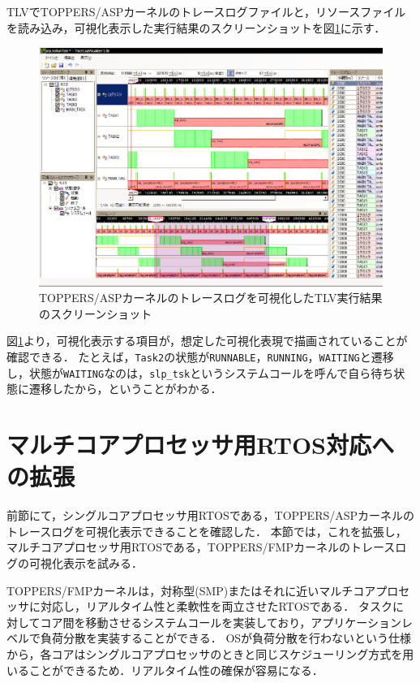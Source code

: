TLVでTOPPERS/ASPカーネルのトレースログファイルと，リソースファイルを読み込み，可視化表示した実行結果のスクリーンショットを図\ref{fig:aspTLVscreenShot}に示す．

\begin{figure}[tb]
\begin{center}
\includegraphics[width=15cm]{img/aspTLVscreenShot.eps}
\caption{TOPPERS/ASPカーネルのトレースログを可視化したTLV実行結果のスクリーンショット}
\label{fig:aspTLVscreenShot}
\end{center}
\end{figure}

図\ref{fig:aspTLVscreenShot}より，可視化表示する項目が，想定した可視化表現で描画されていることが確認できる．
たとえば，{\tt Task2}の状態が{\tt RUNNABLE}，{\tt RUNNING}，{\tt WAITING}と遷移し，状態が{\tt WAITING}なのは，{\tt slp\_tsk}というシステムコールを呼んで自ら待ち状態に遷移したから，ということがわかる．

\section{マルチコアプロセッサ用RTOS対応への拡張}

前節にて，シングルコアプロセッサ用RTOSである，TOPPERS/ASPカーネルのトレースログを可視化表示できることを確認した．
本節では，これを拡張し，マルチコアプロセッサ用RTOSである，TOPPERS/FMPカーネル\cite{TOPPERS}のトレースログの可視化表示を試みる．

TOPPERS/FMPカーネルは，対称型(SMP)またはそれに近いマルチコアプロセッサに対応し，リアルタイム性と柔軟性を両立させたRTOSである．
タスクに対してコア間を移動させるシステムコールを実装しており，アプリケーションレベルで負荷分散を実装することができる．
OSが負荷分散を行わないという仕様から，各コアはシングルコアプロセッサのときと同じスケジューリング方式を用いることができるため．リアルタイム性の確保が容易になる．

